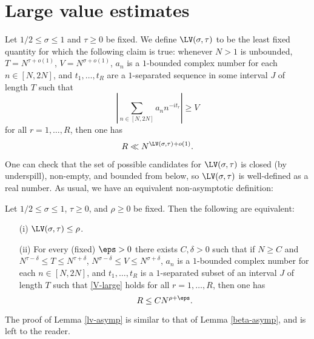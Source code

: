 \chapter{Large value estimates}

\begin{definition}\label{lv-def} Let $1/2 \leq \sigma \leq 1$ and $\tau \geq 0$ be fixed. We define $\LV(\sigma,\tau)$ to be the least fixed quantity for which the following claim is true: whenever $N > 1$ is unbounded, $T = N^{\tau+o(1)}$, $V = N^{\sigma+o(1)}$, $a_n$ is a $1$-bounded complex number for each $n \in [N,2N]$, and $t_1,\dots,t_R$ are a $1$-separated sequence in some interval $J$ of length $T$ such that
\begin{equation}\label{V-large} 
    \left|\sum_{n \in [N,2N]} a_n n^{-it_r} \right| \geq V
\end{equation}
    for all $r=1,\dots,R$, then one has
$$ R \ll N^{\LV(\sigma,\tau)+o(1)}.$$
\end{definition}


One can check that the set of possible candidates for $\LV(\sigma,\tau)$ is closed (by underspill), non-empty, and bounded from below, so $\LV(\sigma,\tau)$ is well-defined as a real number.  As usual, we have an equivalent non-asymptotic definition:

\begin{lemma}\label{lv-asymp} Let $1/2 \leq \sigma \leq 1$, $\tau \geq 0$, and $\rho \geq 0$ be fixed.  Then the following are equivalent:
    \begin{itemize}
    \item[(i)] $\LV(\sigma,\tau) \leq \rho$.
    \item[(ii)] For every (fixed)  $\eps>0$ there exists $C, \delta>0$ such that if $N \geq C$ and $N^{\tau-\delta} \leq T \leq N^{\tau+\delta}$, $N^{\sigma-\delta} \leq V \leq N^{\sigma+\delta}$, $a_n$ is a $1$-bounded complex number for each $n \in [N,2N]$, and $t_1,\dots,t_R$ is a $1$-separated subset of an interval $J$ of length $T$ such that \eqref{V-large} holds for all $r=1,\dots,R$, then one has
    $$ R \leq C N^{\rho+\eps}.$$
    \end{itemize}
\end{lemma}

The proof of Lemma \ref{lv-asymp} is similar to that of Lemma \ref{beta-asymp}, and is left to the reader.


